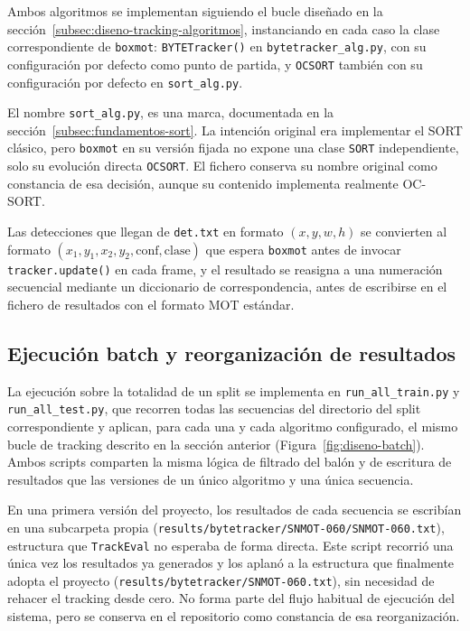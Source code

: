 Ambos algoritmos se implementan siguiendo el bucle diseñado en la
sección~\ref{subsec:diseno-tracking-algoritmos}, instanciando en cada caso la clase
correspondiente de \texttt{boxmot}: \texttt{BYTETracker()} en
\texttt{bytetracker\_alg.py}, con su configuración por defecto como punto
de partida, y
\texttt{OCSORT} también con su configuración por defecto en
\texttt{sort\_alg.py}.

El nombre \texttt{sort\_alg.py}, es una marca, documentada en la sección~\ref{subsec:fundamentos-sort}. La
intención original era implementar el SORT clásico, pero \texttt{boxmot}
en su versión fijada no expone una clase \texttt{SORT} independiente,
solo su evolución directa \texttt{OCSORT}. El fichero conserva su nombre
original como constancia de esa decisión, aunque su contenido implementa
realmente OC-SORT.

Las detecciones que llegan de \texttt{det.txt} en formato
$(x, y, w, h)$ se convierten al formato $(x_1, y_1, x_2, y_2, \text{conf},
\text{clase})$ que espera \texttt{boxmot} antes de invocar
\texttt{tracker.update()} en cada frame, y el resultado se reasigna a una numeración secuencial
mediante un diccionario de correspondencia, antes de escribirse en
el fichero de resultados con el formato MOT estándar.

\subsection{Ejecución batch y reorganización de resultados}

La ejecución sobre la totalidad de un split se implementa en
\texttt{run\_all\_train.py} y \texttt{run\_all\_test.py}, que recorren
todas las secuencias del directorio del split correspondiente y aplican,
para cada una y cada algoritmo configurado, el mismo bucle de tracking
descrito en la sección anterior (Figura~\ref{fig:diseno-batch}). Ambos
scripts comparten la misma lógica de filtrado del balón y de escritura de
resultados que las versiones de un único algoritmo y una única secuencia.

En una primera versión del proyecto, los
resultados de cada secuencia se escribían en una subcarpeta propia
(\texttt{results/bytetracker/SNMOT-060/SNMOT-060.txt}), estructura que
\texttt{TrackEval} no esperaba de forma directa. Este script recorrió una
única vez los resultados ya generados y los aplanó a la estructura que
finalmente adopta el proyecto (\texttt{results/bytetracker/SNMOT-060.txt}),
sin necesidad de rehacer el tracking desde cero. No forma parte del flujo
habitual de ejecución del sistema, pero se conserva en el repositorio como
constancia de esa reorganización.

